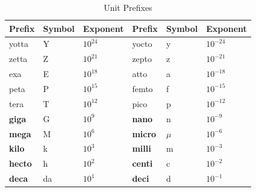           \begin{table}[H]
        \begin{center}
      \label{m30853*uid32}
    \noindent
      \begin{tabular}{|l|l|l|l|l|l|}\hline
                \textbf{Prefix}
               &
                \textbf{Symbol}
               &
                \textbf{Exponent}
               &
                \textbf{Prefix}
               &
                \textbf{Symbol}
               &
                \textbf{Exponent}
               \\ \hline
        yotta &
        Y &
                ${10}^{24}$
               &
        yocto &
        y &
                ${10}^{-24}$
              \\ \hline
        zetta &
        Z &
                ${10}^{21}$
               &
        zepto &
        z &
                ${10}^{-21}$
             \\ \hline
        exa &
        E &
                ${10}^{18}$
               &
        atto &
        a &
                ${10}^{-18}$
              \\ \hline
        peta &
        P &
                ${10}^{15}$
               &
        femto &
        f &
                ${10}^{-15}$
              \\ \hline
        tera &
        T &
                ${10}^{12}$
               &
        pico &
        p &
                ${10}^{-12}$
              \\ \hline
                \textbf{giga}
               &
        G &
                ${10}^{9}$
               &
                \textbf{nano}
               &
        n &
                ${10}^{-9}$
              \\ \hline
                \textbf{mega}
               &
        M &
                ${10}^{6}$
               &
                \textbf{micro}
               &
                $\mu $
               &
                ${10}^{-6}$
              \\ \hline
                \textbf{kilo}
               &
        k &
                ${10}^{3}$
               &
                \textbf{milli}
               &
        m &
                ${10}^{-3}$
            \\ \hline
                \textbf{hecto}
               &
        h &
                ${10}^{2}$
               &
                \textbf{centi}
               &
        c &
                ${10}^{-2}$
             \\ \hline
                \textbf{deca}
               &
        da &
                ${10}^{1}$
               &
                \textbf{deci}
               &
        d &
                ${10}^{-1}$
              \\ \hline
    \end{tabular}
\caption{Unit Prefixes}
      \end{center}
\end{table}
